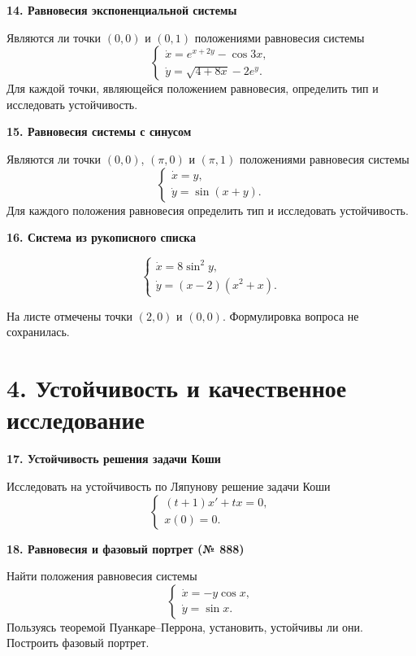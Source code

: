 \documentclass[11pt,a4paper]{article}
\newcommand{\sect}[1]{\Needspace{85mm}\section*{\color{accent}#1}}
\newcommand{\task}[2]{\par\vspace{6pt}
 {\bfseries\color{accent}#1. #2}\par}
\newcommand{\note}[1]{\par{\small\color{muted}#1}\par}
\begin{document}
\begin{minipage}[t]{\linewidth}
\task{14}{Равновесия экспоненциальной системы}
Являются ли точки $(0,0)$ и $(0,1)$ положениями равновесия системы
\[
 \begin{cases}
 \dot x=e^{x+2y}-\cos 3x,\\
 \dot y=\sqrt{4+8x}-2e^y.
 \end{cases}
\]
Для каждой точки, являющейся положением равновесия, определить тип и
исследовать устойчивость.
\end{minipage}\par\vspace{6pt}

\begin{minipage}[t]{\linewidth}
\task{15}{Равновесия системы с синусом}
Являются ли точки $(0,0)$, $(\pi,0)$ и $(\pi,1)$ положениями равновесия системы
\[
 \begin{cases}
 \dot x=y,\\
 \dot y=\sin(x+y).
 \end{cases}
\]
Для каждого положения равновесия определить тип и исследовать устойчивость.
\end{minipage}\par\vspace{6pt}

\begin{minipage}[t]{\linewidth}
\task{16}{Система из рукописного списка}
\[
 \begin{cases}
 \dot x=8\sin^2 y,\\
 \dot y=(x-2)(x^2+x).
 \end{cases}
\]
\note{На листе отмечены точки $(2,0)$ и $(0,0)$.
Формулировка вопроса не сохранилась.}
\end{minipage}\par\vspace{6pt}

\sect{4. Устойчивость и качественное исследование}

\begin{minipage}[t]{\linewidth}
\task{17}{Устойчивость решения задачи Коши}
Исследовать на устойчивость по Ляпунову решение задачи Коши
\[
 \begin{cases}
 (t+1)x'+tx=0,\\
 x(0)=0.
 \end{cases}
\]
\end{minipage}\par\vspace{6pt}

\begin{minipage}[t]{\linewidth}
\task{18}{Равновесия и фазовый портрет (№ 888)}
Найти положения равновесия системы
\[
 \begin{cases}
 \dot x=-y\cos x,\\
 \dot y=\sin x.
 \end{cases}
\]
Пользуясь теоремой Пуанкаре--Перрона, установить, устойчивы ли они.
Построить фазовый портрет.
\end{minipage}\par\vspace{6pt}
\end{document}
